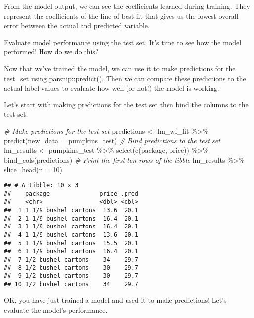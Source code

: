 \documentclass[
]{article}
\newenvironment{Shaded}{\begin{snugshade}}{\end{snugshade}}
\newcommand{\AttributeTok}[1]{\textcolor[rgb]{0.77,0.63,0.00}{#1}}
\newcommand{\CommentTok}[1]{\textcolor[rgb]{0.56,0.35,0.01}{\textit{#1}}}
\newcommand{\DecValTok}[1]{\textcolor[rgb]{0.00,0.00,0.81}{#1}}
\newcommand{\FunctionTok}[1]{\textcolor[rgb]{0.00,0.00,0.00}{#1}}
\newcommand{\NormalTok}[1]{#1}
\newcommand{\OtherTok}[1]{\textcolor[rgb]{0.56,0.35,0.01}{#1}}
\newcommand{\SpecialCharTok}[1]{\textcolor[rgb]{0.00,0.00,0.00}{#1}}
\begin{document}
From the model output, we can see the coefficients learned during
training. They represent the coefficients of the line of best fit that
gives us the lowest overall error between the actual and predicted
variable.

Evaluate model performance using the test set. It's time to see how the
model performed! How do we do this?

Now that we've trained the model, we can use it to make predictions for
the test\_set using parsnip::predict(). Then we can compare these
predictions to the actual label values to evaluate how well (or not!)
the model is working.

Let's start with making predictions for the test set then bind the
columns to the test set.

\begin{Shaded}
\begin{Highlighting}[]
\CommentTok{\# Make predictions for the test set}
\NormalTok{predictions }\OtherTok{\textless{}{-}}\NormalTok{ lm\_wf\_fit }\SpecialCharTok{\%\textgreater{}\%} 
  \FunctionTok{predict}\NormalTok{(}\AttributeTok{new\_data =}\NormalTok{ pumpkins\_test)}
\CommentTok{\# Bind predictions to the test set}
\NormalTok{lm\_results }\OtherTok{\textless{}{-}}\NormalTok{ pumpkins\_test }\SpecialCharTok{\%\textgreater{}\%} 
  \FunctionTok{select}\NormalTok{(}\FunctionTok{c}\NormalTok{(package, price)) }\SpecialCharTok{\%\textgreater{}\%} 
  \FunctionTok{bind\_cols}\NormalTok{(predictions)}
\CommentTok{\# Print the first ten rows of the tibble}
\NormalTok{lm\_results }\SpecialCharTok{\%\textgreater{}\%} 
  \FunctionTok{slice\_head}\NormalTok{(}\AttributeTok{n =} \DecValTok{10}\NormalTok{)}
\end{Highlighting}
\end{Shaded}

\begin{verbatim}
## # A tibble: 10 x 3
##    package              price .pred
##    <chr>                <dbl> <dbl>
##  1 1 1/9 bushel cartons  13.6  20.1
##  2 1 1/9 bushel cartons  16.4  20.1
##  3 1 1/9 bushel cartons  16.4  20.1
##  4 1 1/9 bushel cartons  13.6  20.1
##  5 1 1/9 bushel cartons  15.5  20.1
##  6 1 1/9 bushel cartons  16.4  20.1
##  7 1/2 bushel cartons    34    29.7
##  8 1/2 bushel cartons    30    29.7
##  9 1/2 bushel cartons    30    29.7
## 10 1/2 bushel cartons    34    29.7
\end{verbatim}

OK, you have just trained a model and used it to make predictions! Let's
evaluate the model's performance.
\end{document}
